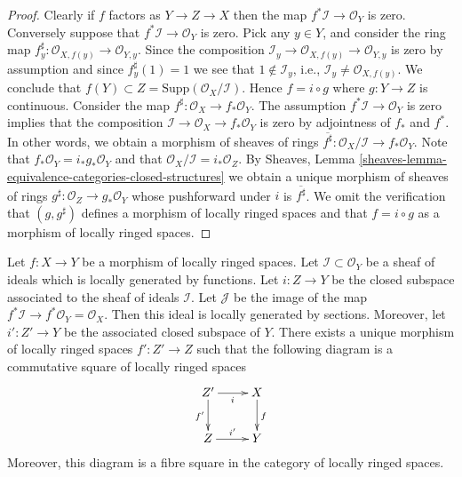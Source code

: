 \begin{proof}
Clearly if $f$ factors as $Y \to Z \to X$ then the map
$f^*\mathcal{I} \to \mathcal{O}_Y$ is zero. Conversely
suppose that $f^*\mathcal{I} \to \mathcal{O}_Y$ is zero.
Pick any $y \in Y$, and consider the ring map
$f^\sharp_y : \mathcal{O}_{X, f(y)} \to \mathcal{O}_{Y, y}$.
Since the composition
$\mathcal{I}_y \to \mathcal{O}_{X, f(y)} \to \mathcal{O}_{Y, y}$
is zero by assumption and since $f^\sharp_y(1) = 1$
we see that $1 \not \in \mathcal{I}_y$, i.e.,
$\mathcal{I}_y \not = \mathcal{O}_{X, f(y)}$. We conclude that
$f(Y) \subset Z = \text{Supp}(\mathcal{O}_X/\mathcal{I})$.
Hence $f = i \circ g$ where $g : Y \to Z$ is continuous.
Consider the map $f^\sharp : \mathcal{O}_X \to f_*\mathcal{O}_Y$.
The assumption $f^*\mathcal{I} \to \mathcal{O}_Y$ is zero implies that
the composition $\mathcal{I} \to \mathcal{O}_X \to f_*\mathcal{O}_Y$ is
zero by adjointness of $f_*$ and $f^*$.
In other words, we obtain a morphism of sheaves of rings
$\overline{f^\sharp} : \mathcal{O}_X/\mathcal{I} \to f_*\mathcal{O}_Y$.
Note that $f_*\mathcal{O}_Y = i_*g_*\mathcal{O}_Y$ and
that $\mathcal{O}_X/\mathcal{I} = i_*\mathcal{O}_Z$.
By Sheaves, Lemma \ref{sheaves-lemma-equivalence-categories-closed-structures}
we obtain a unique morphism of sheaves of rings
$g^\sharp : \mathcal{O}_Z \to g_*\mathcal{O}_Y$ whose pushforward
under $i$ is $\overline{f^\sharp}$. We omit the verification that
$(g, g^\sharp)$ defines a morphism of locally ringed spaces
and that $f = i \circ g$ as a morphism of locally ringed spaces.
\end{proof}

\begin{lemma}
\label{lemma-restrict-map-to-closed}
Let $f : X \to Y$ be a morphism of locally ringed spaces.
Let $\mathcal{I} \subset \mathcal{O}_Y$ be a sheaf of
ideals which is locally generated by functions.
Let $i : Z \to Y$ be the closed subspace associated to the
sheaf of ideals $\mathcal{I}$.
Let $\mathcal{J}$ be the image of the map
$f^*\mathcal{I} \to f^*\mathcal{O}_Y = \mathcal{O}_X$.
Then this ideal is locally generated by sections.
Moreover, let $i' : Z' \to Y$ be the associated closed
subspace of $Y$. There exists a unique
morphism of locally ringed spaces $f' : Z' \to Z$ such
that the following diagram is a commutative square of
locally ringed spaces
$$
\xymatrix{
Z' \ar[d]_{f'} \ar[r]_i & X \ar[d]^f \\
Z \ar[r]^{i'} & Y 
}
$$
Moreover, this diagram is a fibre square in the category of
locally ringed spaces.
\end{lemma}

